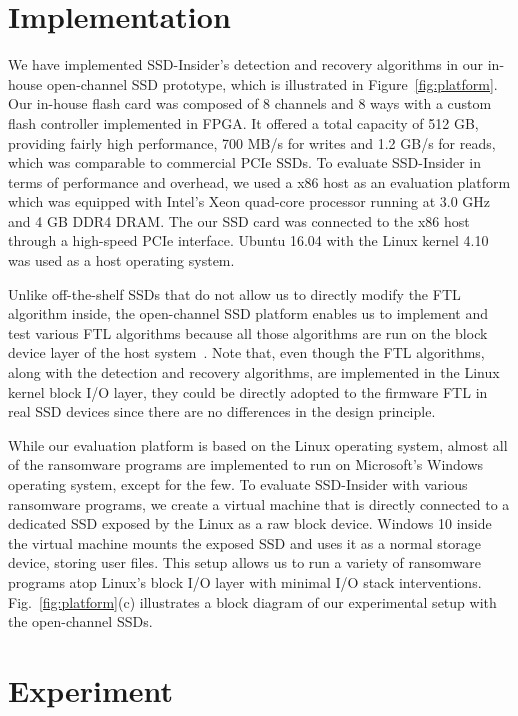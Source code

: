 \documentclass[conference]{IEEEtran}
\newcommand{\ours}{SSD-Insider}
\begin{document}
\section{Implementation}
We have implemented \ours{}'s detection and recovery algorithms in
our in-house open-channel SSD prototype, which is illustrated in
Figure~\ref{fig:platform}.  Our in-house flash card was composed of
8 channels and 8 ways with a custom flash controller implemented in
FPGA.  It offered a total capacity of 512 GB, providing fairly high
performance, 700 MB/s for writes and 1.2 GB/s for reads, which was
comparable to commercial PCIe SSDs.  To evaluate \ours{} in terms
of performance and overhead, we used a x86 host as an evaluation
platform which was equipped with Intel's Xeon quad-core processor
running at 3.0 GHz and 4 GB DDR4 DRAM.  The our SSD card was
connected to the x86 host through a high-speed PCIe interface.
Ubuntu 16.04 with the Linux kernel 4.10 was used as a host
operating system.  

Unlike off-the-shelf SSDs that do not allow us to directly modify
the FTL algorithm inside, the open-channel SSD platform enables us
to implement and test various FTL algorithms because all those
algorithms are run on the block device layer of the host
system~\cite{lightnvm}.  Note that, even though the FTL algorithms,
along with the detection and recovery algorithms, are implemented
in the Linux kernel block I/O layer, they could be directly adopted
to the firmware FTL in real SSD devices since there are no
differences in the design principle.

While our evaluation platform is based on the Linux operating
system, almost all of the ransomware programs are implemented to
run on Microsoft's Windows operating system, except for the few.
To evaluate \ours{} with various ransomware programs, we create a
virtual machine that is directly connected to a dedicated SSD
exposed by the Linux as a raw block device.  Windows 10 inside the
virtual machine mounts the exposed SSD and uses it as a normal
storage device, storing user files. This setup allows us to run a
variety of ransomware programs atop Linux's block I/O layer with
minimal I/O stack interventions. Fig.~\ref{fig:platform}(c)
illustrates a block diagram of our experimental setup with the
open-channel SSDs.


\section{Experiment}
\end{document}
